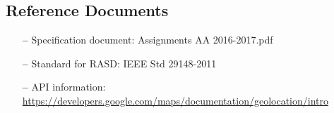 \subsection{Reference Documents} \label{ref-doc}

\begin{itemize}
\item[\textbf{--}] Specification document: Assignments AA 2016-2017.pdf
\item[\textbf{--}] Standard for RASD: IEEE Std 29148-2011
\item[\textbf{--}] API information: \url{https://developers.google.com/maps/documentation/geolocation/intro}
\end{itemize}



